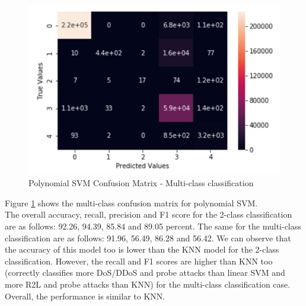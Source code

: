 \begin{figure}
	\includegraphics[width=1.0\columnwidth]{images/svmpolyall.PNG}
	\caption{Polynomial SVM Confusion Matrix - Multi-class classification}
	\label{F:polysvmall}
\end{figure}
Figure \ref{F:polysvmall} shows the multi-class confusion matrix for polynomial SVM.\\
The overall accuracy, recall, precision and F1 score for the 2-class classification are as follows: 92.26, 94.39, 85.84 and 89.05 percent. The same for the multi-class classification are as follows: 91.96, 56.49, 86.28
and 56.42. We can observe that the accuracy of this model too is lower than the KNN model for the 2-class classification. However, the recall and F1 scores are higher than KNN too (correctly classifies more DoS/DDoS and probe attacks than linear SVM and more R2L and probe attacks than KNN) for the multi-class classification case. Overall, the performance is similar to KNN.

